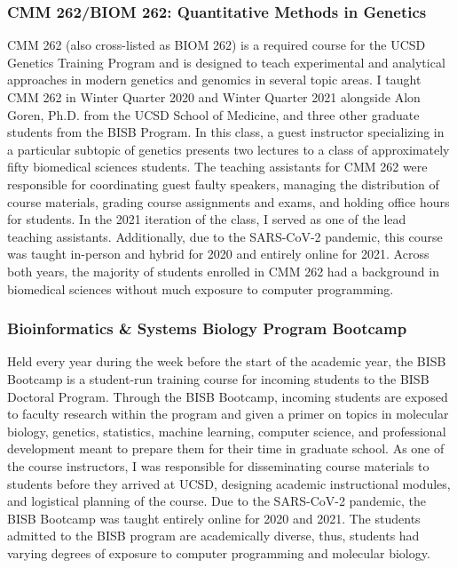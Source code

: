 \subsubsection{CMM 262/BIOM 262: Quantitative Methods in Genetics}
CMM 262 (also cross-listed as BIOM 262) is a required course for the UCSD Genetics Training Program and is designed to teach experimental and analytical approaches in modern genetics and genomics in several topic areas. I taught CMM 262 in Winter Quarter 2020 and Winter Quarter 2021 alongside Alon Goren, Ph.D. from the UCSD School of Medicine, and three other graduate students from the BISB Program. In this class, a guest instructor specializing in a particular subtopic of genetics presents two lectures to a class of approximately fifty biomedical sciences students. The teaching assistants for CMM 262 were responsible for coordinating guest faulty speakers, managing the distribution of course materials, grading course assignments and exams, and holding office hours for students. In the 2021 iteration of the class, I served as one of the lead teaching assistants. Additionally, due to the SARS-CoV-2 pandemic, this course was taught in-person and hybrid for 2020 and entirely online for 2021. Across both years, the majority of students enrolled in CMM 262 had a background in biomedical sciences without much exposure to computer programming.

\subsubsection{Bioinformatics \& Systems Biology Program Bootcamp}
Held every year during the week before the start of the academic year, the BISB Bootcamp is a student-run training course for incoming students to the BISB Doctoral Program. Through the BISB Bootcamp, incoming students are exposed to faculty research within the program and given a primer on topics in molecular biology, genetics, statistics, machine learning, computer science, and professional development meant to prepare them for their time in graduate school. As one of the course instructors, I was responsible for disseminating course materials to students before they arrived at UCSD, designing academic instructional modules, and logistical planning of the course. Due to the SARS-CoV-2 pandemic, the BISB Bootcamp was taught entirely online for 2020 and 2021. The students admitted to the BISB program are academically diverse, thus, students had varying degrees of exposure to computer programming and molecular biology.

